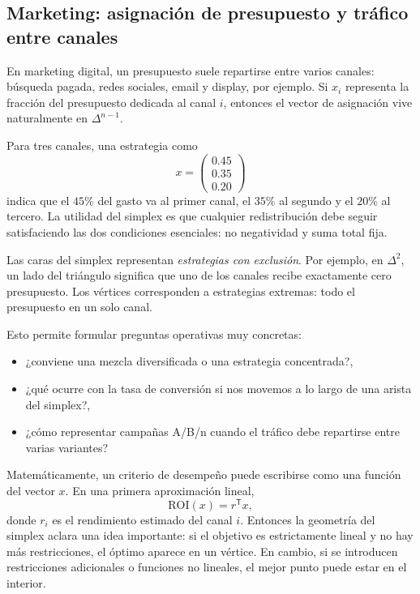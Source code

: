 \documentclass[10pt,a4paper,oneside]{article}
\theoremstyle{plain}
\theoremstyle{definition}
\theoremstyle{remark}
\begin{document}
\subsection{Marketing: asignación de presupuesto y tráfico entre canales}

En marketing digital, un presupuesto suele repartirse entre varios canales: búsqueda pagada, redes sociales, email y display, por ejemplo. Si $x_i$ representa la fracción del presupuesto dedicada al canal $i$, entonces el vector de asignación vive naturalmente en $\Delta^{n-1}$.

Para tres canales, una estrategia como
\[
x=
\begin{pmatrix}
0.45\\0.35\\0.20
\end{pmatrix}
\]
indica que el $45\%$ del gasto va al primer canal, el $35\%$ al segundo y el $20\%$ al tercero. La utilidad del simplex es que cualquier redistribución debe seguir satisfaciendo las dos condiciones esenciales: no negatividad y suma total fija.

\begin{intuitionBox}
Las caras del simplex representan \emph{estrategias con exclusión}. Por ejemplo, en $\Delta^2$, un lado del triángulo significa que uno de los canales recibe exactamente cero presupuesto. Los vértices corresponden a estrategias extremas: todo el presupuesto en un solo canal.
\end{intuitionBox}

Esto permite formular preguntas operativas muy concretas:
\begin{itemize}
\item ¿conviene una mezcla diversificada o una estrategia concentrada?,
\item ¿qué ocurre con la tasa de conversión si nos movemos a lo largo de una arista del simplex?,
\item ¿cómo representar campañas A/B/n cuando el tráfico debe repartirse entre varias variantes?
\end{itemize}

Matemáticamente, un criterio de desempeño puede escribirse como una función del vector $x$. En una primera aproximación lineal,
\[
\text{ROI}(x)=r^{\mathsf T}x,
\]
donde $r_i$ es el rendimiento estimado del canal $i$. Entonces la geometría del simplex aclara una idea importante: si el objetivo es estrictamente lineal y no hay más restricciones, el óptimo aparece en un vértice. En cambio, si se introducen restricciones adicionales o funciones no lineales, el mejor punto puede estar en el interior.
\end{document}

